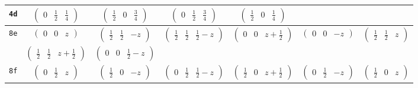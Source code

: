 \documentclass[fleqn,9pt,landscape]{jsarticle}
\begin{document}
\begin{center}
\begin{longtable}{ccccccc}
{\tt 4d} & $ \begin{pmatrix} 0 & \frac{1}{2} & \frac{1}{4} \end{pmatrix} $ & $ \begin{pmatrix} \frac{1}{2} & 0 & \frac{3}{4} \end{pmatrix} $ & $ \begin{pmatrix} 0 & \frac{1}{2} & \frac{3}{4} \end{pmatrix} $ & $ \begin{pmatrix} \frac{1}{2} & 0 & \frac{1}{4} \end{pmatrix} $ & $  $ & $  $ \\ \hline
{\tt 8e} & $ \begin{pmatrix} 0 & 0 & z \end{pmatrix} $ & $ \begin{pmatrix} \frac{1}{2} & \frac{1}{2} & - z \end{pmatrix} $ & $ \begin{pmatrix} \frac{1}{2} & \frac{1}{2} & \frac{1}{2} - z \end{pmatrix} $ & $ \begin{pmatrix} 0 & 0 & z + \frac{1}{2} \end{pmatrix} $ & $ \begin{pmatrix} 0 & 0 & - z \end{pmatrix} $ & $ \begin{pmatrix} \frac{1}{2} & \frac{1}{2} & z \end{pmatrix} $ \\
& $ \begin{pmatrix} \frac{1}{2} & \frac{1}{2} & z + \frac{1}{2} \end{pmatrix} $ & $ \begin{pmatrix} 0 & 0 & \frac{1}{2} - z \end{pmatrix} $ & $  $ & $  $ & $  $ & $  $ \\ \hline
{\tt 8f} & $ \begin{pmatrix} 0 & \frac{1}{2} & z \end{pmatrix} $ & $ \begin{pmatrix} \frac{1}{2} & 0 & - z \end{pmatrix} $ & $ \begin{pmatrix} 0 & \frac{1}{2} & \frac{1}{2} - z \end{pmatrix} $ & $ \begin{pmatrix} \frac{1}{2} & 0 & z + \frac{1}{2} \end{pmatrix} $ & $ \begin{pmatrix} 0 & \frac{1}{2} & - z \end{pmatrix} $ & $ \begin{pmatrix} \frac{1}{2} & 0 & z \end{pmatrix} $ \\

\end{longtable}
\end{center}
\end{document}
